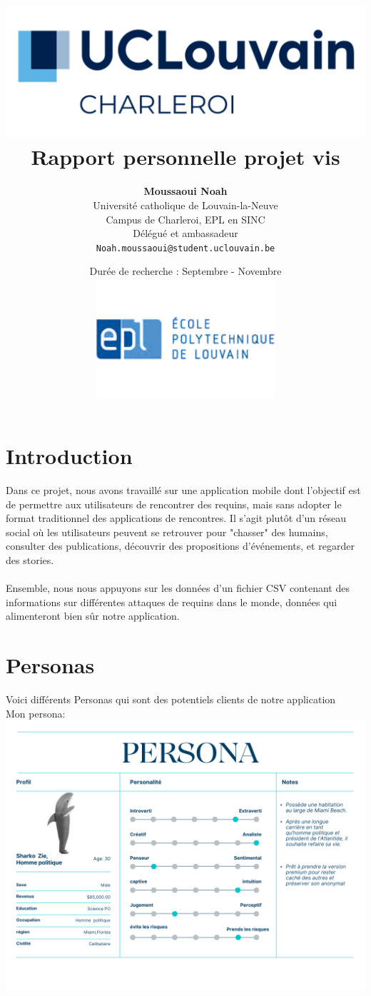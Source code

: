 \documentclass{article}
\title{
    \includegraphics[width=1\textwidth]{photo/UCLouvain_Charleroi.png} \\
    \vspace{1.5cm}
    {\Huge \textbf{Rapport personnelle projet vis}} \\
    \vspace{1.5cm}
}
\author{
    \textbf{Moussaoui Noah} \\
    Université catholique de Louvain-la-Neuve \\
    Campus de Charleroi, EPL en SINC \\
    Délégué et ambassadeur \\
    \texttt{Noah.moussaoui@student.uclouvain.be}
}
\date{
    \vspace{1.5cm}
    Durée de recherche : Septembre - Novembre \\
     \vspace{1.5cm}
    \includegraphics[width=0.5\textwidth]{photo/EPL.png}
}
\begin{document}
\maketitle
\newpage
\section{Introduction}
Dans ce projet, nous avons travaillé sur une application mobile dont l'objectif est de permettre 
aux utilisateurs de rencontrer des requins, mais sans adopter le format traditionnel des applications
de rencontres. Il s'agit plutôt d'un réseau social où les utilisateurs peuvent se retrouver pour 
"chasser" des humains, consulter des publications, découvrir des propositions d’événements, 
et regarder des stories.\\\\

Ensemble, nous nous appuyons sur les données d’un fichier CSV contenant des informations 
sur différentes attaques de requins dans le monde, données qui alimenteront bien sûr notre application.


\section{Personas}
Voici différents Personas qui sont des potentiels  clients de notre application \\

Mon persona:\\

\includegraphics[width=1\textwidth]{photo/Personna_Sharkozie.png}\\
\end{document}
